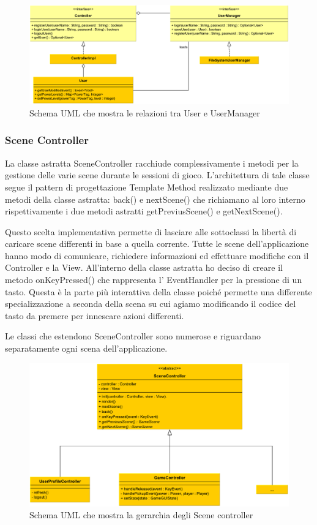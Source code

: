 \documentclass[a4paper,12pt]{report}
\begin{document}
\begin{figure}[H]
\includegraphics[width=\linewidth]{img/user}
\caption{Schema UML che mostra le relazioni tra User e UserManager}
\label{img:decorator}
\end{figure}

\subsubsection*{Scene Controller}
La classe astratta SceneController racchiude complessivamente i metodi per la gestione delle varie scene durante le sessioni di gioco.
L'architettura di tale classe segue il pattern di progettazione Template Method realizzato mediante due metodi della classe astratta: back() e nextScene() che richiamano al loro interno rispettivamente i due metodi astratti getPreviusScene() e getNextScene().

Questo scelta implementativa permette di lasciare alle sottoclassi la libertà di caricare scene differenti in base a quella corrente.
Tutte le scene dell'applicazione hanno modo di comunicare, richiedere informazioni ed effettuare modifiche con il Controller e la View.
All'interno della classe astratta ho deciso di creare il metodo onKeyPressed() che rappresenta l' EventHandler per la pressione di un tasto.
Questa è la parte più interattiva della classe poiché permette una differente specializzazione a seconda della scena su cui agiamo modificando il codice del tasto da premere per innescare azioni differenti.

Le classi che estendono SceneController sono numerose e riguardano separatamente ogni scena dell'applicazione.

\begin{figure}[H]
\includegraphics[width=\linewidth]{img/scene_controller}
\caption{Schema UML che mostra la gerarchia degli Scene controller}
\label{img:decorator}
\end{figure}
\end{document}
